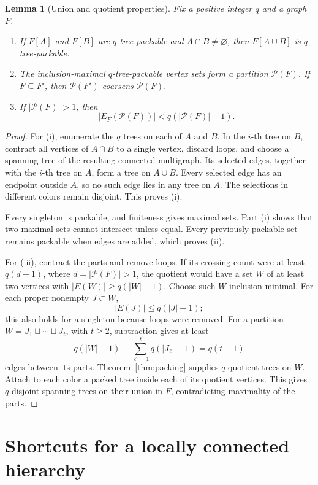 \documentclass[11pt]{amsart}
\newtheorem{lemma}[theorem]{Lemma}
\theoremstyle{definition}
\theoremstyle{remark}
\numberwithin{equation}{section}
\begin{document}
\begin{lemma}[Union and quotient properties]\label{lem:packing-parts}
Fix a positive integer \(q\) and a graph \(F\).
\begin{enumerate}[label=\textup{(\roman*)}]
\item If \(F[A]\) and \(F[B]\) are \(q\)-tree-packable and
\(A\cap B\ne\varnothing\), then \(F[A\cup B]\) is
\(q\)-tree-packable.
\item The inclusion-maximal \(q\)-tree-packable vertex sets form a
partition \(\mathcal P(F)\). If \(F\subseteq F'\), then
\(\mathcal P(F')\) coarsens \(\mathcal P(F)\).
\item If \(|\mathcal P(F)|>1\), then
\[
 |E_F(\mathcal P(F))|<q(|\mathcal P(F)|-1).
\]
\end{enumerate}
\end{lemma}
\begin{proof}
For (i), enumerate the \(q\) trees on each of \(A\) and \(B\).
In the \(i\)-th tree on \(B\), contract all vertices of \(A\cap B\)
to a single vertex, discard loops, and choose a spanning tree of
the resulting connected multigraph. Its selected edges, together
with the \(i\)-th tree on \(A\), form a tree on \(A\cup B\).
Every selected edge has an endpoint outside \(A\), so no such edge
lies in any tree on \(A\). The selections in different colors
remain disjoint. This proves (i).

Every singleton is packable, and finiteness gives maximal sets.
Part (i) shows that two maximal sets cannot intersect unless equal.
Every previously packable set remains packable when edges are added,
which proves (ii).

For (iii), contract the parts and remove loops.
If its crossing count were at least \(q(d-1)\), where
\(d=|\mathcal P(F)|>1\), the quotient would have a set
\(W\) of at least two vertices with
\(|E(W)|\ge q(|W|-1)\).
Choose such \(W\) inclusion-minimal. For each proper nonempty
\(J\subset W\),
\[
 |E(J)|\le q(|J|-1);
\]
this also holds for a singleton because loops were removed.
For a partition \(W=J_1\sqcup\cdots\sqcup J_t\), with \(t\ge2\),
subtraction gives at least
\[
 q(|W|-1)-\sum_{\ell=1}^t q(|J_\ell|-1)=q(t-1)
\]
edges between its parts. Theorem~\ref{thm:packing} supplies \(q\)
quotient trees on \(W\).
Attach to each color a packed tree inside each of its quotient
vertices. This gives \(q\) disjoint spanning trees on their union
in \(F\), contradicting maximality of the parts.
\end{proof}

\section{Shortcuts for a locally connected hierarchy}\label{sec:hierarchy}
\end{document}
